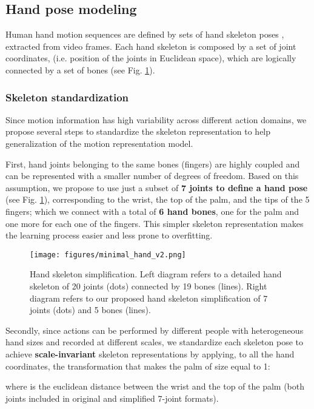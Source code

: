 \documentclass[letterpaper, 10 pt, conference]{ieeeconf}
\begin{document}
\subsection{Hand pose modeling}\label{sec:hand_modeling}

Human hand motion sequences are defined by sets of  hand skeleton poses , extracted from video frames. 
Each hand skeleton  is composed by a set of  joint coordinates,  (i.e. position of the joints in Euclidean space), which are logically connected by a set of  bones 
(see Fig. \ref{fig:min_hand}). 



\subsubsection{Skeleton standardization}
Since motion information has high variability across different action domains, we propose several steps to standardize the skeleton representation to help generalization of the motion representation model.


First, hand joints belonging to the same bones (fingers) are highly coupled and can be represented with a smaller number of degrees of freedom.
Based on this assumption, we propose to use just a subset of \textbf{7 joints to define a hand pose} (see Fig. \ref{fig:min_hand}), corresponding to the wrist, the top of the palm, and the tips of the 5 fingers; which we connect with a total of \textbf{6 hand bones}, one for the palm and one more for each one of the fingers. 
This simpler skeleton representation makes the learning process easier and less prone to overfitting.

\begin{figure}
    \centering
    \texttt{[image: figures/minimal\_hand\_v2.png]}
    \caption{Hand skeleton simplification. Left diagram refers to a detailed hand skeleton of 20 joints (dots) connected by 19 bones (lines). Right diagram refers to our proposed hand skeleton simplification of 7 joints (dots) and 5 bones (lines).
    }
    \label{fig:min_hand}
\end{figure}


Secondly, since actions can be performed by different people with heterogeneous hand sizes and recorded at different scales, we standardize each skeleton pose  to achieve \textbf{scale-invariant} skeleton representations  by applying, to all the hand coordinates, the transformation that makes the palm of size equal to 1: 


where  is the euclidean distance between the wrist and the top of the palm  (both joints included in original and simplified 7-joint formats).
\end{document}
